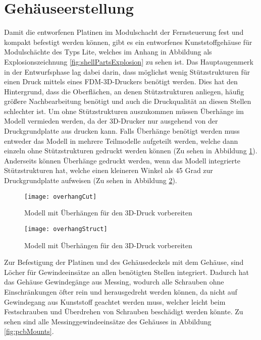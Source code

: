 \section{Gehäuseerstellung}
Damit die entworfenen Platinen im Modulschacht der Fernsteuerung fest und kompakt befestigt werden können, gibt es ein entworfenes Kunststoffgehäuse für Modulschächte des Typs Lite, welches im Anhang in Abbildung als Explosionszeichnung \ref{fig:shellPartsExplosion} zu sehen ist. Das Hauptaugenmerk in der Entwurfsphase lag dabei darin, dass möglichst wenig Stützstrukturen für einen Druck mittels eines \ac{FDM}-3D-Druckers benötigt werden. Dies hat den Hintergrund, dass die Oberflächen, an denen Stützstrukturen anliegen, häufig größere Nachbearbeitung benötigt und auch die Druckqualität an diesen Stellen schlechter ist. Um ohne Stützstrukturen auszukommen müssen Überhänge im Modell vermieden werden, da der 3D-Drucker nur ausgehend von der Druckgrundplatte aus drucken kann. Falls Überhänge benötigt werden muss entweder das Modell in mehrere Teilmodelle aufgeteilt werden, welche dann einzeln ohne Stützstrukturen gedruckt werden können (Zu sehen in Abbildung \ref{fig:overhangCut}). Anderseits können Überhänge gedruckt werden, wenn das Modell integrierte Stützstrukturen hat, welche einen kleineren Winkel als 45 Grad zur Druckgrundplatte aufweisen (Zu sehen in Abbildung \ref{fig:overhangStruct}).

\begin{figure}[h]
    \centering
    \texttt{[image: overhangCut]}
    \caption{Modell mit Überhängen für den 3D-Druck vorbereiten}
    \label{fig:overhangCut}
\end{figure}

\begin{figure}[h]
    \centering
    \texttt{[image: overhangStruct]}
    \caption{Modell mit Überhängen für den 3D-Druck vorbereiten}
    \label{fig:overhangStruct}
\end{figure}

Zur Befestigung der Platinen und des Gehäusedeckels mit dem Gehäuse, sind Löcher für Gewindeeinsätze an allen benötigten Stellen integriert. Dadurch hat das Gehäuse Gewindegänge aus Messing, wodurch alle Schrauben ohne Einschränkungen öfter rein und herausgedreht werden können, da nicht auf Gewindegang aus Kunststoff geachtet werden muss, welcher leicht beim Festschrauben und Überdrehen von Schrauben beschädigt werden könnte. Zu sehen sind alle Messinggewindeeinsätze des Gehäuses in Abbildung \ref{fig:pcbMounts}.

